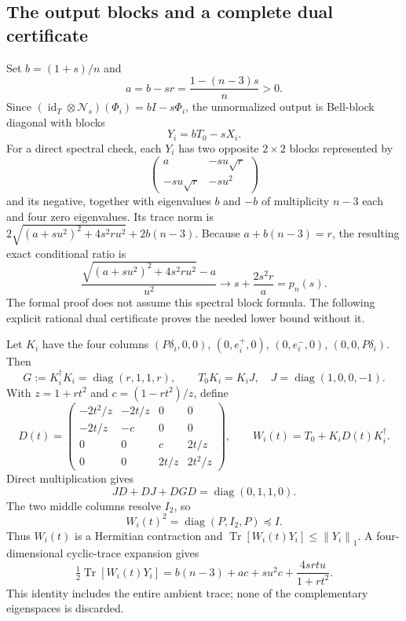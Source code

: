 \documentclass[11pt,a4paper]{article}
\newcommand{\Tr}{\operatorname{Tr}}
\newcommand{\id}{\operatorname{id}}
\newcommand{\cN}{\mathcal N}
\newcommand{\norm}[1]{\left\lVert#1\right\rVert}
\begin{document}
\subsection{The output blocks and a complete dual certificate}
Set $b=(1+s)/n$ and
\[
 a=b-sr=\frac{1-(n-3)s}{n}>0.
\]
Since $(\id_T\otimes\cN_s)(\Phi_i)=bI-s\Phi_i$, the unnormalized output is Bell-block diagonal with blocks
\[
 Y_i=bT_0-sX_i.
\]
For a direct spectral check, each $Y_i$ has two opposite $2\times2$ blocks represented by
\[
 \begin{pmatrix}a&-su\sqrt r\\-su\sqrt r&-su^2\end{pmatrix}
\]
and its negative, together with eigenvalues $b$ and $-b$ of multiplicity $n-3$ each and four zero eigenvalues. Its trace norm is
$2\sqrt{(a+su^2)^2+4s^2ru^2}+2b(n-3)$.
Because $a+b(n-3)=r$, the resulting exact conditional ratio is
\begin{equation}\label{eq:sqrt-ratio}
 \frac{\sqrt{(a+su^2)^2+4s^2ru^2}-a}{u^2}
 \longrightarrow s+\frac{2s^2r}{a}=p_n(s).
\end{equation}
The formal proof does not assume this spectral block formula. The following explicit rational dual certificate proves the needed lower bound without it.

Let $K_i$ have the four columns $(P\delta_i,0,0)$, $(0,e_i^+,0)$, $(0,e_i^-,0)$, $(0,0,P\delta_i)$. Then
\[
 G:=K_i^\dagger K_i=\operatorname{diag}(r,1,1,r),\qquad
 T_0K_i=K_iJ,\quad J=\operatorname{diag}(1,0,0,-1).
\]
With $z=1+rt^2$ and $c=(1-rt^2)/z$, define
\[
 D(t)=\begin{pmatrix}
 -2t^2/z&-2t/z&0&0\\
 -2t/z&-c&0&0\\
 0&0&c&2t/z\\
 0&0&2t/z&2t^2/z
 \end{pmatrix},\qquad W_i(t)=T_0+K_iD(t)K_i^\dagger.
\]
Direct multiplication gives
\[
 JD+DJ+DGD=\operatorname{diag}(0,1,1,0).
\]
The two middle columns resolve $I_2$, so
\[
 W_i(t)^2=\operatorname{diag}(P,I_2,P)\preceq I.
\]
Thus $W_i(t)$ is a Hermitian contraction and $\Tr[W_i(t)Y_i]\le\norm{Y_i}_1$. A four-dimensional cyclic-trace expansion gives
\begin{equation}\label{eq:pairing}
 \tfrac12\Tr[W_i(t)Y_i]
 =b(n-3)+a c+su^2 c+\frac{4srtu}{1+rt^2}.
\end{equation}
This identity includes the entire ambient trace; none of the complementary eigenspaces is discarded.
\end{document}
